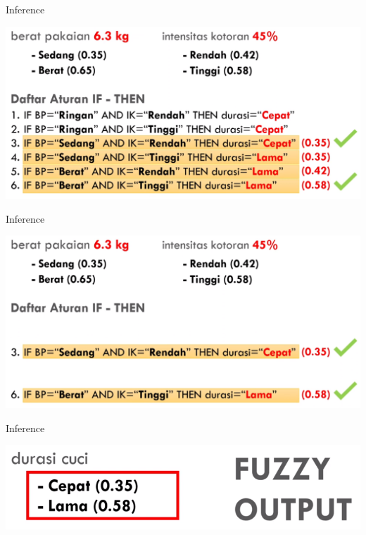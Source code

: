 \documentclass[pdflatex,compress,mathserif]{beamer}
\begin{document}
\begin{frame}{Inference}
	\begin{center}
		\includegraphics[width=\linewidth]{img/35}
	\end{center}
\end{frame}

\begin{frame}{Inference}
	\begin{center}
		\includegraphics[width=\linewidth]{img/36}
	\end{center}
\end{frame}

\begin{frame}{Inference}
	\begin{center}
		\includegraphics[width=\linewidth]{img/37}
	\end{center}
\end{frame}
\end{document}
